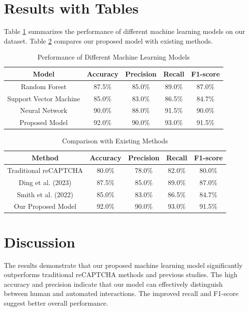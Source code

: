 \documentclass{article}
\begin{document}
\section{Results with Tables}
Table \ref{table:models} summarizes the performance of different machine learning models on our dataset. Table \ref{table:comparison} compares our proposed model with existing methods.

\begin{table}[ht]
\centering
\caption{Performance of Different Machine Learning Models}
\label{table:models}
\begin{tabular}{|c|c|c|c|c|}
\hline
Model & Accuracy & Precision & Recall & F1-score \\
\hline
Random Forest & 87.5\% & 85.0\% & 89.0\% & 87.0\% \\
Support Vector Machine & 85.0\% & 83.0\% & 86.5\% & 84.7\% \\
Neural Network & 90.0\% & 88.0\% & 91.5\% & 90.0\% \\
Proposed Model & 92.0\% & 90.0\% & 93.0\% & 91.5\% \\
\hline
\end{tabular}
\end{table}

\begin{table}[ht]
\centering
\caption{Comparison with Existing Methods}
\label{table:comparison}
\begin{tabular}{|c|c|c|c|c|}
\hline
Method & Accuracy & Precision & Recall & F1-score \\
\hline
Traditional reCAPTCHA & 80.0\% & 78.0\% & 82.0\% & 80.0\% \\
Ding et al. (2023) & 87.5\% & 85.0\% & 89.0\% & 87.0\% \\
Smith et al. (2022) & 85.0\% & 83.0\% & 86.5\% & 84.7\% \\
Our Proposed Model & 92.0\% & 90.0\% & 93.0\% & 91.5\% \\
\hline
\end{tabular}
\end{table}

\section{Discussion}
The results demonstrate that our proposed machine learning model significantly outperforms traditional reCAPTCHA methods and previous studies. The high accuracy and precision indicate that our model can effectively distinguish between human and automated interactions. The improved recall and F1-score suggest better overall performance.
\end{document}
